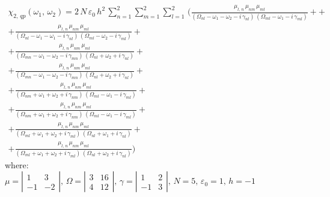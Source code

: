 \documentclass[12pt,twoside,a4paper]{article}
\numberwithin{equation}{subsection}
\numberwithin{figure}{subsection}
\begin{document}
\begin{multline} \label{hcc_qp2}
  \chi_{2, \,qp}({\omega_{1}}, \,{\omega_{2}}) = 
  2\,N\,\varepsilon_{0}\,h^{2}\,\sum_{n=1}^{2}\sum_{m=1}^{2}\sum_{l=1}^{2}\,
  (
       \frac {{\mu_{l,\,n}}\,{\mu_{nm}}\,{\mu_{ml}}}
      {({\Omega_{nl}} - \omega_1 - \omega_2 - i\,{\gamma_{nl}})\,({\Omega_{ml}} - \omega_1 - i\,{\gamma_{ml}})} +
+ \\ + \frac {{\mu_{l, \,n}}\,{\mu_{nm}}\,{\mu_{ml}}}
      {({\Omega_{nl}} - \omega_1 - \omega_1 - i\,{\gamma_{nl}})\,({\Omega_{ml}} - \omega_2 - i\,{\gamma_{ml}})}
+ \\ + \frac {{\mu_{l, \,n}}\,{\mu_{nm}}\,{\mu_{ml}}}
      {({\Omega_{mn}} - \omega_1 - \omega_2 - i\,{\gamma_{mn}})\,({\Omega_{nl}} + \omega_2 + i\,{\gamma_{nl}})}
+ \\ + \frac {{\mu_{l, \,n }}\,{\mu_{nm}}\,{\mu_{ml}}} 
      {({\Omega_{mn}} - \omega_1 - \omega_2 - i\,{\gamma_{mn}})\,({\Omega_{nl}} + \omega_2 + i\,{\gamma_{nl}})} 
+ \\ + \frac {{\mu_{l, \,n}}\,{\mu_{nm}}\,{\mu_{ml}}}
      {({\Omega_{nm}} + \omega_1 + \omega_2 + i\,{\gamma_{nm}})\,({\Omega_{ml}} - \omega_1 - i\,{\gamma_{ml}})}
+\\ + \frac {{\mu_{l, \,n}}\,{\mu_{ nm}}\,{\mu_{ml}}}
      {({\Omega_{nm}} + \omega_1 + \omega_2 + i\,{\gamma_{nm}})\,({\Omega_{ml}} - \omega_1 - i\,{\gamma_{ml}})} 
+ \\ + \frac {{\mu_{l, \,n}}\,{\mu_{nm}}\,{\mu_{ml}}}
      {({\Omega_{ml}} + \omega_1 + \omega_2 + i\,{\gamma_{ml}})\,({\Omega_{nl}} + \omega_1 + i\,{\gamma_{nl}})}
+\\ + \frac {{\mu_{l, \,n}}\,{\mu_{nm}}\,{\mu_{ml}}}
      {({\Omega_{ml}} + \omega_1 + \omega_2 + i\,{\gamma_{ml}})\,({\Omega_{nl}} + \omega_2 + i\,{\gamma_{nl}})}
  )  
\end{multline}
where: \\
$\mu = \left| \begin{array}{cc} 
    1 & 3 \\ -1 & -2 
  \end{array} \right|,\, 
  \Omega = \left| \begin{array}{cc} 
    3 & 16 \\ 4 & 12 
  \end{array} \right|,\,
  \gamma = \left| \begin{array}{cc} 
  1 & 2 \\ -1 & 3
  \end{array} \right|,\, N=5,\, {\varepsilon_{0}}=1,\,h= - 1$
\end{document}
